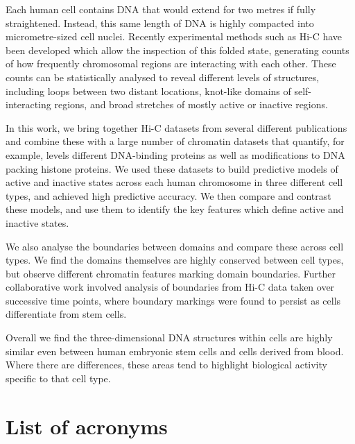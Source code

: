 \documentclass[a4paper,11pt,twoside]{book}
\begin{document}
Each human cell contains DNA that would extend for two metres if fully straightened. Instead, this same length of DNA is highly compacted into micrometre-sized cell nuclei. Recently experimental methods such as Hi-C have been developed which allow the inspection of this folded state, generating counts of how frequently chromosomal regions are interacting with each other. These counts can be statistically analysed to reveal different levels of structures, including loops between two distant locations, knot-like domains of self-interacting regions, and broad stretches of mostly active or inactive regions. 

In this work, we bring together Hi-C datasets from several different publications and combine these with a large number of chromatin datasets that quantify, for example, levels different DNA-binding proteins as well as modifications to DNA packing histone proteins. We used these datasets to build predictive models of active and inactive states across each human chromosome in three different cell types, and achieved high predictive accuracy. We then compare and contrast these models, and use them to identify the key features which define active and inactive states. 

We also analyse the boundaries between domains and compare these across cell types. We find the domains themselves are highly conserved between cell types, but observe different chromatin features marking domain boundaries. Further collaborative work involved analysis of boundaries from Hi-C data taken over successive time points, where boundary markings were found to persist as cells differentiate from stem cells.

Overall we find the three-dimensional DNA structures within cells are highly similar even between human embryonic stem cells and cells derived from blood. Where there are differences, these areas tend to highlight biological activity specific to that cell type.

\clearpage

\tableofcontents
\clearpage

\listoffigures
\clearpage

\listoftables
\clearpage

\chapter{List of acronyms}
\end{document}
